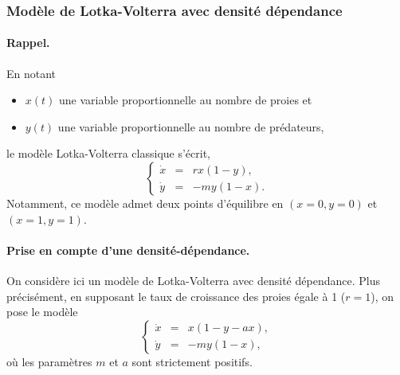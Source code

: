 \subsubsection{Modèle de Lotka-Volterra avec densité dépendance} 

\paragraph{Rappel.}
En notant 
\begin{itemize}
  \item $x(t)$ une variable proportionnelle au nombre de proies et
  \item $y(t)$ une variable proportionnelle au nombre de prédateurs,
\end{itemize}
le modèle Lotka-Volterra classique s'écrit, 
\begin{equation} \label{eq:LV}
\left\{\begin{array}{rcr}
        \dot x & = & r x (1 - y), \\ 
        \dot y & = & - m y (1 - x).
        \end{array}\right.
\end{equation}
Notamment, ce modèle admet deux points d'équilibre en $(x=0, y=0)$ et $(x=1, y=1)$.

\paragraph{Prise en compte d'une densité-dépendance.}
On considère ici un modèle de Lotka-Volterra avec densité dépendance. Plus précisément, en supposant le taux de croissance des proies égale à 1 ($r = 1$), on pose le modèle
\begin{equation} \label{eq:LVDD}
\left\{\begin{array}{rcr}
        \dot x & = & x (1 - y - ax), \\ 
        \dot y & = & - m y (1 - x), 
        \end{array}\right.
\end{equation}
où les paramètres $m$ et $a$ sont strictement positifs. 

\bigskip
